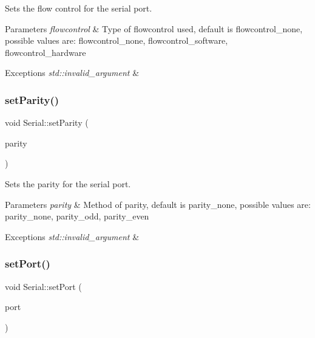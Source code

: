 Sets the flow control for the serial port.


\begin{DoxyParams}{Parameters}
{\em flowcontrol} & Type of flowcontrol used, default is flowcontrol\+\_\+none, possible values are\+: flowcontrol\+\_\+none, flowcontrol\+\_\+software, flowcontrol\+\_\+hardware\\
\hline
\end{DoxyParams}

\begin{DoxyExceptions}{Exceptions}
{\em std\+::invalid\+\_\+argument} & \\
\hline
\end{DoxyExceptions}
\mbox{\label{classserial_1_1_serial_a1e1896aa59ec35ac5bd263b87614ef01}} 
\subsubsection{\texorpdfstring{set\+Parity()}{setParity()}}
{\footnotesize\ttfamily void Serial\+::set\+Parity (\begin{DoxyParamCaption}\item[{\mbox{\hyperlink{namespaceserial_a8f45d26bf7c9a06659e75b5004a50481}{parity\+\_\+t}}}]{parity }\end{DoxyParamCaption})}

Sets the parity for the serial port.


\begin{DoxyParams}{Parameters}
{\em parity} & Method of parity, default is parity\+\_\+none, possible values are\+: parity\+\_\+none, parity\+\_\+odd, parity\+\_\+even\\
\hline
\end{DoxyParams}

\begin{DoxyExceptions}{Exceptions}
{\em std\+::invalid\+\_\+argument} & \\
\hline
\end{DoxyExceptions}
\mbox{\label{classserial_1_1_serial_acecb0a5102ae0c944fe4b78e4adf839a}} 
\subsubsection{\texorpdfstring{set\+Port()}{setPort()}}
{\footnotesize\ttfamily void Serial\+::set\+Port (\begin{DoxyParamCaption}\item[{const std\+::string \&}]{port }\end{DoxyParamCaption})}

